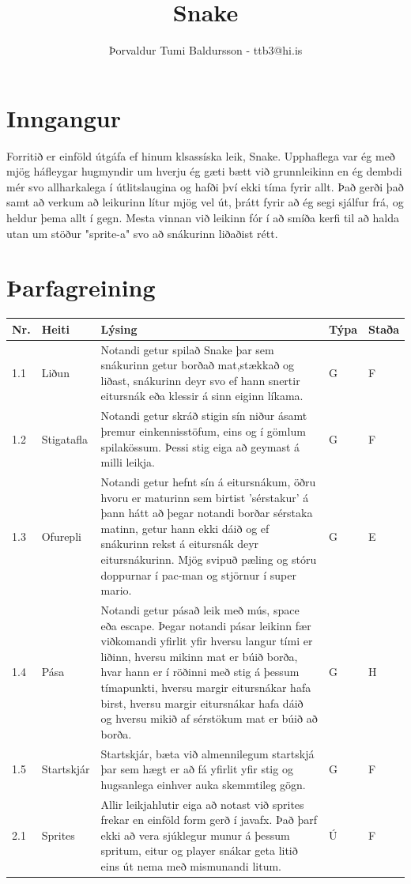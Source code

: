 \documentclass[a4paper]{paper}
\title{Snake}
\author{Þorvaldur Tumi Baldursson - ttb3@hi.is}
\begin{document}
\maketitle

\section{Inngangur}
Forritið er einföld útgáfa ef hinum klsassíska leik, Snake. 
Upphaflega var ég með mjög háfleygar hugmyndir um hverju ég gæti bætt við grunnleikinn en ég dembdi mér svo allharkalega í útlitslaugina og hafði því ekki tíma fyrir allt.
Það gerði það samt að verkum að leikurinn lítur mjög vel út, þrátt fyrir að ég segi sjálfur frá, og heldur þema allt í gegn.
Mesta vinnan við leikinn fór í að smíða kerfi til að halda utan um stöður "sprite-a" svo að snákurinn liðaðist rétt. 

\section{Þarfagreining}
\begin{center}
    \begin{tabular}{|l|l|p{6cm}|l|l|}
        \hline
        Nr.&Heiti&Lýsing&Týpa&Staða\\ \hline
        1.1&Liðun&Notandi getur spilað Snake þar sem snákurinn getur borðað mat,stækkað og liðast, 
        snákurinn deyr svo ef hann snertir eitursnák eða klessir á sinn eiginn líkama.&G&F\\ \hline
        1.2&Stigatafla&Notandi getur skráð stigin sín niður ásamt þremur einkennisstöfum,
        eins og í gömlum spilakössum. Þessi stig eiga að geymast á milli leikja.&G&F\\ \hline
        1.3&Ofurepli&Notandi getur hefnt sín á eitursnákum, öðru hvoru er maturinn sem birtist 'sérstakur'
        á þann hátt að þegar notandi borðar sérstaka matinn, 
        getur hann ekki dáið og ef snákurinn rekst á eitursnák deyr eitursnákurinn.
        Mjög svipuð pæling og stóru doppurnar í pac-man og stjörnur í super mario.&G&E\\ \hline
        1.4&Pása&Notandi getur pásað leik með mús, space eða escape. 
        Þegar notandi pásar leikinn fær viðkomandi yfirlit yfir hversu langur tími er liðinn,
        hversu mikinn mat er búið borða, hvar hann er í röðinni með stig á þessum tímapunkti, 
        hversu margir eitursnákar hafa birst, hversu margir eitursnákar hafa dáið og hversu mikið af sérstökum mat er búið að borða.&G&H\\ \hline
        1.5&Startskjár&Startskjár, 
        bæta við almennilegum startskjá þar sem hægt er að fá yfirlit yfir stig 
        og hugsanlega einhver auka skemmtileg gögn.&G&F\\ \hline
        2.1&Sprites&Allir leikjahlutir eiga að notast við sprites frekar en einföld form gerð í javafx.
        Það þarf ekki að vera sjúklegur munur á þessum spritum, 
        eitur og player snákar geta litið eins út nema með mismunandi litum.&Ú&F\\ \hline
        \end{tabular}
\end{center}
\end{document}
